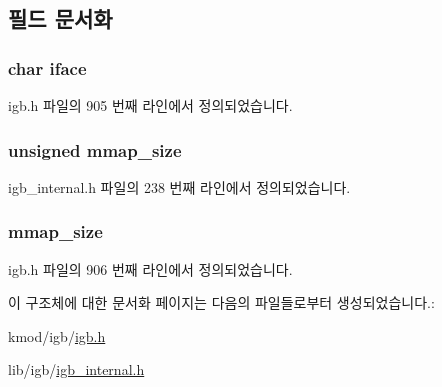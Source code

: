 \subsection{필드 문서화}
\subsubsection[{\texorpdfstring{iface}{iface}}]{\setlength{\rightskip}{0pt plus 5cm}char iface}\hypertarget{structigb__bind__cmd_a88d38e6b8b8e975415f5cef8fbfe2b74}{}\label{structigb__bind__cmd_a88d38e6b8b8e975415f5cef8fbfe2b74}


igb.\+h 파일의 905 번째 라인에서 정의되었습니다.

\subsubsection[{\texorpdfstring{mmap\+\_\+size}{mmap_size}}]{\setlength{\rightskip}{0pt plus 5cm}unsigned mmap\+\_\+size}\hypertarget{structigb__bind__cmd_a8d8b3ba9537bc3a0307ef782434516ea}{}\label{structigb__bind__cmd_a8d8b3ba9537bc3a0307ef782434516ea}


igb\+\_\+internal.\+h 파일의 238 번째 라인에서 정의되었습니다.

\subsubsection[{\texorpdfstring{mmap\+\_\+size}{mmap_size}}]{ mmap\+\_\+size}\hypertarget{structigb__bind__cmd_ac76710c49696b7df6ecbef456496ea50}{}\label{structigb__bind__cmd_ac76710c49696b7df6ecbef456496ea50}


igb.\+h 파일의 906 번째 라인에서 정의되었습니다.



이 구조체에 대한 문서화 페이지는 다음의 파일들로부터 생성되었습니다.\+:\begin{DoxyCompactItemize}
\item 
kmod/igb/\hyperlink{kmod_2igb_2igb_8h}{igb.\+h}\item 
lib/igb/\hyperlink{igb__internal_8h}{igb\+\_\+internal.\+h}\end{DoxyCompactItemize}
